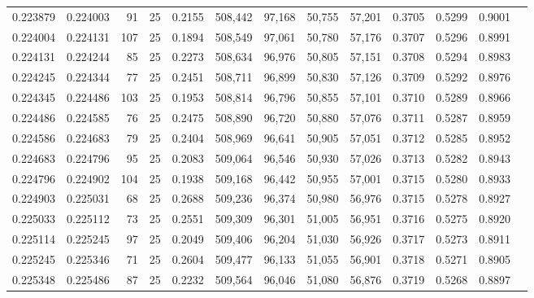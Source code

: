 \begin{tabular}{rrrrrrrrrrrrr}
0.223879 & 0.224003 &    91 &  25 &                                     0.2155 & 508,442 &  97,168 &  50,755 &  57,201 & 0.3705 & 0.5299 & 0.9001 \\
0.224004 & 0.224131 &   107 &  25 &                                     0.1894 & 508,549 &  97,061 &  50,780 &  57,176 & 0.3707 & 0.5296 & 0.8991 \\
0.224131 & 0.224244 &    85 &  25 &                                     0.2273 & 508,634 &  96,976 &  50,805 &  57,151 & 0.3708 & 0.5294 & 0.8983 \\
0.224245 & 0.224344 &    77 &  25 &                                     0.2451 & 508,711 &  96,899 &  50,830 &  57,126 & 0.3709 & 0.5292 & 0.8976 \\
0.224345 & 0.224486 &   103 &  25 &                                     0.1953 & 508,814 &  96,796 &  50,855 &  57,101 & 0.3710 & 0.5289 & 0.8966 \\
0.224486 & 0.224585 &    76 &  25 &                                     0.2475 & 508,890 &  96,720 &  50,880 &  57,076 & 0.3711 & 0.5287 & 0.8959 \\
0.224586 & 0.224683 &    79 &  25 &                                     0.2404 & 508,969 &  96,641 &  50,905 &  57,051 & 0.3712 & 0.5285 & 0.8952 \\
0.224683 & 0.224796 &    95 &  25 &                                     0.2083 & 509,064 &  96,546 &  50,930 &  57,026 & 0.3713 & 0.5282 & 0.8943 \\
0.224796 & 0.224902 &   104 &  25 &                                     0.1938 & 509,168 &  96,442 &  50,955 &  57,001 & 0.3715 & 0.5280 & 0.8933 \\
0.224903 & 0.225031 &    68 &  25 &                                     0.2688 & 509,236 &  96,374 &  50,980 &  56,976 & 0.3715 & 0.5278 & 0.8927 \\
0.225033 & 0.225112 &    73 &  25 &                                     0.2551 & 509,309 &  96,301 &  51,005 &  56,951 & 0.3716 & 0.5275 & 0.8920 \\
0.225114 & 0.225245 &    97 &  25 &                                     0.2049 & 509,406 &  96,204 &  51,030 &  56,926 & 0.3717 & 0.5273 & 0.8911 \\
0.225245 & 0.225346 &    71 &  25 &                                     0.2604 & 509,477 &  96,133 &  51,055 &  56,901 & 0.3718 & 0.5271 & 0.8905 \\
0.225348 & 0.225486 &    87 &  25 &                                     0.2232 & 509,564 &  96,046 &  51,080 &  56,876 & 0.3719 & 0.5268 & 0.8897 \\

\end{tabular}
